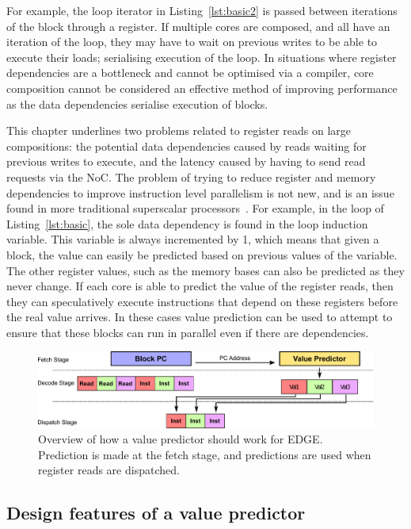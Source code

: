 For example, the loop iterator in Listing~\ref{lst:basic2} is passed between iterations of the block through a register.
If multiple cores are composed, and all have an iteration of the loop, they may have to wait on previous writes to be able to execute their loads; serialising execution of the loop.
In situations where register dependencies are a bottleneck and cannot be optimised via a compiler, core composition cannot be considered an effective method of improving performance as the data dependencies serialise execution of blocks.

This chapter underlines two problems related to register reads on large compositions: the potential data dependencies caused by reads waiting for previous writes to execute, and the latency caused by having to send read requests via the NoC.
The problem of trying to reduce register and memory dependencies to improve instruction level parallelism is not new, and is an issue found in more traditional superscalar processors~\cite{peraisVTAGE2014}.
For example, in the loop of Listing~\ref{lst:basic}, the sole data dependency is found in the loop induction variable.
This variable is always incremented by 1, which means that given a block, the value can easily be predicted based on previous values of the variable.
The other register values, such as the memory bases can also be predicted as they never change.
If each core is able to predict the value of the register reads, then they can speculatively execute instructions that depend on these registers before the real value arrives.
In these cases value prediction can be used to attempt to ensure that these blocks can run in parallel even if there are dependencies.

\begin{figure}[t]
    \centering
    \includegraphics[width=1\textwidth]{chapter3/graphics/val_pred_overview.pdf}
    \caption{Overview of how a value predictor should work for EDGE. Prediction is made at the fetch stage, and predictions are used when register reads are dispatched.}
    \label{fig:bad_overview}
\vspace{1em}
\end{figure}

\subsection{Design features of a value predictor}

